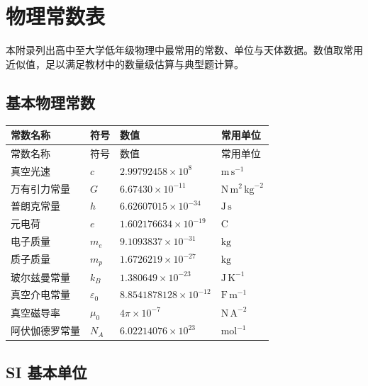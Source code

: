 \chapter{物理常数表}

本附录列出高中至大学低年级物理中最常用的常数、单位与天体数据。数值取常用近似值，足以满足教材中的数量级估算与典型题计算。

\section{基本物理常数}

\begin{longtable}{p{}p{}p{}p{}}
\toprule
常数名称 & 符号 & 数值 & 常用单位 \\
\midrule
\endfirsthead

\toprule
常数名称 & 符号 & 数值 & 常用单位 \\
\midrule
\endhead

\bottomrule
\endfoot

真空光速 & $c$ & $2.99792458\times 10^8$ & $\text{m}\,\text{s}^{-1}$ \\
万有引力常量 & $G$ & $6.67430\times 10^{-11}$ & $\text{N}\,\text{m}^2\,\text{kg}^{-2}$ \\
普朗克常量 & $h$ & $6.62607015\times 10^{-34}$ & $\text{J}\,\text{s}$ \\
元电荷 & $e$ & $1.602176634\times 10^{-19}$ & $\text{C}$ \\
电子质量 & $m_e$ & $9.1093837\times 10^{-31}$ & $\text{kg}$ \\
质子质量 & $m_p$ & $1.6726219\times 10^{-27}$ & $\text{kg}$ \\
玻尔兹曼常量 & $k_B$ & $1.380649\times 10^{-23}$ & $\text{J}\,\text{K}^{-1}$ \\
真空介电常量 & $\varepsilon_0$ & $8.8541878128\times 10^{-12}$ & $\text{F}\,\text{m}^{-1}$ \\
真空磁导率 & $\mu_0$ & $4\pi\times 10^{-7}$ & $\text{N}\,\text{A}^{-2}$ \\
阿伏伽德罗常量 & $N_A$ & $6.02214076\times 10^{23}$ & $\text{mol}^{-1}$ \\
\end{longtable}

\section{SI 基本单位}


